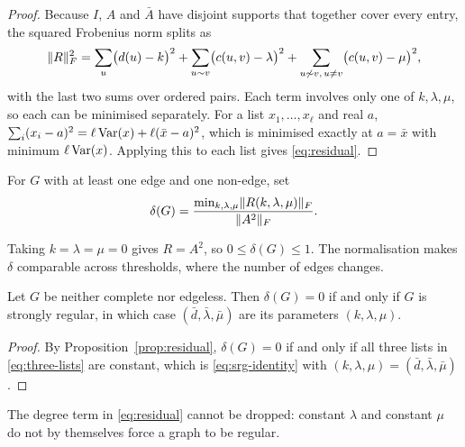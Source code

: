 \begin{proof}
Because $I$, $A$ and $\bar A$ have disjoint supports that together cover every
entry, the squared Frobenius norm splits as
\[
  \lVert R\rVert_F^2=\sum_{u}\bigl(d(u)-k\bigr)^2
  +\sum_{u\sim v}\bigl(c(u,v)-\lambda\bigr)^2
  +\sum_{u\not\sim v,\,u\ne v}\bigl(c(u,v)-\mu\bigr)^2 ,
\]
with the last two sums over ordered pairs. Each term involves only one of
$k,\lambda,\mu$, so each can be minimised separately. For a list
$x_1,\dots,x_\ell$ and real $a$,
$\sum_i(x_i-a)^2=\ell\operatorname{Var}(x)+\ell(\bar x-a)^2$, which is minimised exactly at
$a=\bar x$ with minimum $\ell\operatorname{Var}(x)$. Applying this to each list gives
\eqref{eq:residual}.
\end{proof}

\begin{definition}
\label{def:delta}
For $G$ with at least one edge and one non-edge, set
\[
  \delta(G)=\frac{\min_{k,\lambda,\mu}\lVert R(k,\lambda,\mu)\rVert_F}{\lVert A^2\rVert_F} .
\]
\end{definition}

Taking $k=\lambda=\mu=0$ gives $R=A^2$, so $0\le\delta(G)\le1$. The
normalisation makes $\delta$ comparable across thresholds, where the number of
edges changes.

\begin{corollary}\label{cor:delta-zero}
Let $G$ be neither complete nor edgeless. Then $\delta(G)=0$ if and only if
$G$ is strongly regular, in which case $(\bar d,\bar\lambda,\bar\mu)$ are its
parameters $(k,\lambda,\mu)$.
\end{corollary}

\begin{proof}
By Proposition~\ref{prop:residual}, $\delta(G)=0$ if and only if all three
lists in \eqref{eq:three-lists} are constant, which is \eqref{eq:srg-identity}
with $(k,\lambda,\mu)=(\bar d,\bar\lambda,\bar\mu)$.
\end{proof}

The degree term in \eqref{eq:residual} cannot be dropped: constant $\lambda$
and constant $\mu$ do not by themselves force a graph to be regular.

